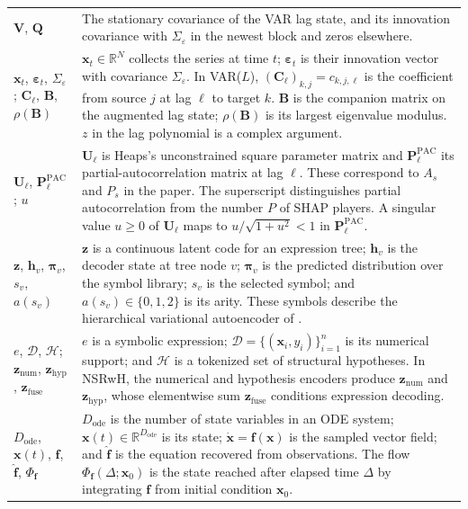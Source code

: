 \begin{longtable}{@{}
>{\raggedright\arraybackslash}p{}
>{\raggedright\arraybackslash}p{}@{}}
$\mathbf V$, $\mathbf Q$ &
The stationary covariance of the VAR lag state, and its innovation covariance
with $\Sigma_\varepsilon$ in the newest block and zeros elsewhere. \\

$\mathbf x_t$, $\boldsymbol\varepsilon_t$, $\Sigma_{\varepsilon}$;
$\mathbf C_\ell$, $\mathbf B$, $\rho(\mathbf B)$ &
$\mathbf x_t\in\mathbb R^N$ collects the series at time $t$;
$\boldsymbol\varepsilon_t$ is their innovation vector with covariance
$\Sigma_{\varepsilon}$. In VAR($L$),
$(\mathbf C_\ell)_{k,j}=c_{k,j,\ell}$ is the coefficient from source $j$ at
lag $\ell$ to target $k$. $\mathbf B$ is the companion matrix on the
augmented lag state; $\rho(\mathbf B)$ is its largest eigenvalue modulus.
$z$ in the lag polynomial is a complex argument. \\

$\mathbf U_\ell$, $\mathbf P_\ell^{\mathrm{PAC}}$; $u$ &
$\mathbf U_\ell$ is Heaps's unconstrained square parameter matrix and
$\mathbf P_\ell^{\mathrm{PAC}}$ its partial-autocorrelation matrix at lag
$\ell$. These correspond to $A_s$ and $P_s$ in the paper. The superscript
distinguishes partial autocorrelation from the number $P$ of SHAP players.
A singular value $u\geq0$ of $\mathbf U_\ell$ maps to
$u/\sqrt{1+u^2}<1$ in $\mathbf P_\ell^{\mathrm{PAC}}$. \\

$\mathbf z$, $\mathbf h_v$, $\boldsymbol\pi_v$, $s_v$, $a(s_v)$ &
$\mathbf z$ is a continuous latent code for an expression tree;
$\mathbf h_v$ is the decoder state at tree node $v$;
$\boldsymbol\pi_v$ is the predicted distribution over the symbol library;
$s_v$ is the selected symbol; and $a(s_v)\in\{0,1,2\}$ is its arity. These
symbols describe the hierarchical variational autoencoder of
\citet{meznar2023efficient}. \\

$e$, $\mathcal D$, $\mathcal H$; $\mathbf z_{\mathrm{num}}$,
$\mathbf z_{\mathrm{hyp}}$, $\mathbf z_{\mathrm{fuse}}$ &
$e$ is a symbolic expression; $\mathcal D=\{(\mathbf x_i,y_i)\}_{i=1}^{n}$ is
its numerical support; and $\mathcal H$ is a tokenized set of structural
hypotheses. In NSRwH, the numerical and hypothesis encoders produce
$\mathbf z_{\mathrm{num}}$ and $\mathbf z_{\mathrm{hyp}}$, whose elementwise
sum $\mathbf z_{\mathrm{fuse}}$ conditions expression decoding. \\

$D_{\mathrm{ode}}$, $\mathbf x(t)$, $\mathbf f$, $\widehat{\mathbf f}$,
$\Phi_{\mathbf f}$ &
$D_{\mathrm{ode}}$ is the number of state variables in an ODE system;
$\mathbf x(t)\in\mathbb R^{D_{\mathrm{ode}}}$ is its state;
$\dot{\mathbf x}=\mathbf f(\mathbf x)$ is the sampled vector field; and
$\widehat{\mathbf f}$ is the equation recovered from observations. The flow
$\Phi_{\mathbf f}(\Delta;\mathbf x_0)$ is the state reached after elapsed time
$\Delta$ by integrating $\mathbf f$ from initial condition $\mathbf x_0$. \\


\end{longtable}
